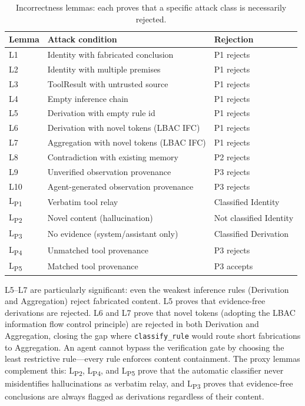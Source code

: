 \documentclass[sigplan,screen,nonacm]{acmart}
\begin{document}
\begin{table}[t]
\caption{Incorrectness lemmas: each proves that a specific attack class is necessarily rejected.}
\label{tab:lemmas}
\begin{tabular}{@{}lll@{}}
\toprule
\textbf{Lemma} & \textbf{Attack condition} & \textbf{Rejection} \\
\midrule
L1 & Identity with fabricated conclusion & P1 rejects \\
L2 & Identity with multiple premises & P1 rejects \\
L3 & ToolResult with untrusted source & P1 rejects \\
L4 & Empty inference chain & P1 rejects \\
L5 & Derivation with empty rule id & P1 rejects \\
L6 & Derivation with novel tokens (LBAC IFC) & P1 rejects \\
L7 & Aggregation with novel tokens (LBAC IFC) & P1 rejects \\
L8 & Contradiction with existing memory & P2 rejects \\
L9 & Unverified observation provenance & P3 rejects \\
L10 & Agent-generated observation provenance & P3 rejects \\
\midrule
L\textsubscript{P1} & Verbatim tool relay & Classified Identity \\
L\textsubscript{P2} & Novel content (hallucination) & Not classified Identity \\
L\textsubscript{P3} & No evidence (system/assistant only) & Classified Derivation \\
L\textsubscript{P4} & Unmatched tool provenance & P3 rejects \\
L\textsubscript{P5} & Matched tool provenance & P3 accepts \\
\bottomrule
\end{tabular}
\end{table}

L5--L7 are particularly significant: even the weakest inference rules
(Derivation and Aggregation) reject fabricated content. L5 proves that
evidence-free derivations are rejected. L6 and L7 prove that novel tokens
(adopting the LBAC~\cite{zhou2026lbac} information flow control principle)
are rejected in both Derivation and Aggregation, closing the gap where
\texttt{classify\_rule} would route short fabrications to Aggregation.
An agent cannot bypass the verification gate by choosing the least
restrictive rule---every rule enforces content containment. The proxy
lemmas complement this: L\textsubscript{P2}, L\textsubscript{P4}, and L\textsubscript{P5} prove that the automatic
classifier never misidentifies hallucinations as verbatim relay, and
L\textsubscript{P3} proves that evidence-free conclusions are always
flagged as derivations regardless of their content.
\end{document}
